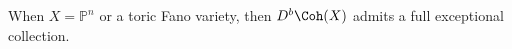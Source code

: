 

When $X = \mathbb{P}^n$ or a toric Fano variety,  then $D^b\Coh(X)$ admits a full exceptional collection. 

